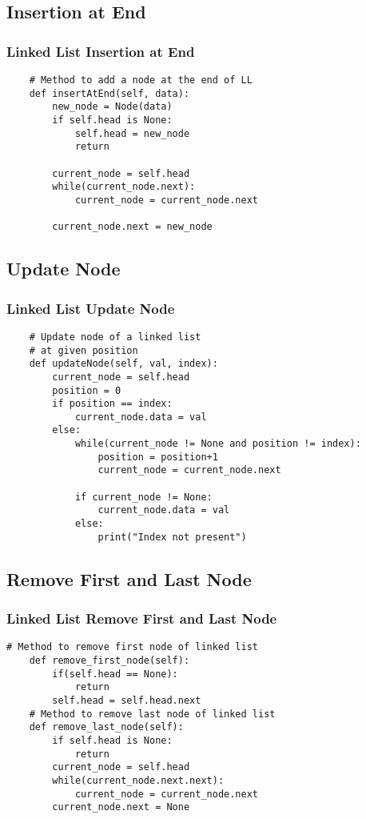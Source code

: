 \documentclass{beamer}
\begin{document}
\begin{frame}[fragile]
\subsection{Insertion at End}
\frametitle{Linked List Insertion at End}
\begin{lstlisting}
    # Method to add a node at the end of LL
    def insertAtEnd(self, data):
        new_node = Node(data)
        if self.head is None:
            self.head = new_node
            return

        current_node = self.head
        while(current_node.next):
            current_node = current_node.next

        current_node.next = new_node
\end{lstlisting}
\end{frame}

\begin{frame}[fragile]
\subsection{Update Node}
\frametitle{Linked List Update Node}
\begin{lstlisting}
    # Update node of a linked list
    # at given position
    def updateNode(self, val, index):
        current_node = self.head
        position = 0
        if position == index:
            current_node.data = val
        else:
            while(current_node != None and position != index):
                position = position+1
                current_node = current_node.next

            if current_node != None:
                current_node.data = val
            else:
                print("Index not present")
\end{lstlisting}
\end{frame}

\begin{frame}[fragile]
\subsection{Remove First and Last Node}
\frametitle{Linked List Remove First and Last Node}
\begin{lstlisting}
# Method to remove first node of linked list
    def remove_first_node(self):
        if(self.head == None):
            return
        self.head = self.head.next
    # Method to remove last node of linked list
    def remove_last_node(self):
        if self.head is None:
            return
        current_node = self.head
        while(current_node.next.next):
            current_node = current_node.next
        current_node.next = None
\end{lstlisting}
\end{frame}
\end{document}
